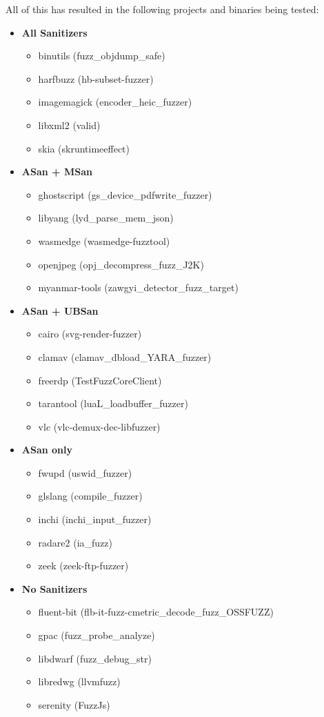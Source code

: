 \newpage
All of this has resulted in the following projects and binaries being tested:
\begin{itemize}
  \item \textbf{All Sanitizers}
  \begin{itemize}
    \item binutils (fuzz\_objdump\_safe)
    \item harfbuzz (hb-subset-fuzzer)
    \item imagemagick (encoder\_heic\_fuzzer)
    \item libxml2 (valid)
    \item skia (skruntimeeffect)
  \end{itemize}
  \item \textbf{ASan + MSan}
  \begin{itemize}
    \item ghostscript (gs\_device\_pdfwrite\_fuzzer)
    \item libyang (lyd\_parse\_mem\_json)
    \item wasmedge (wasmedge-fuzztool)
    \item openjpeg (opj\_decompress\_fuzz\_J2K)
    \item myanmar-tools (zawgyi\_detector\_fuzz\_target)
  \end{itemize}
  \item \textbf{ASan + UBSan}
  \begin{itemize}
    \item cairo (svg-render-fuzzer)
    \item clamav (clamav\_dbload\_YARA\_fuzzer)
    \item freerdp (TestFuzzCoreClient)
    \item tarantool (luaL\_loadbuffer\_fuzzer)
    \item vlc (vlc-demux-dec-libfuzzer)
  \end{itemize}
  \item \textbf{ASan only}
  \begin{itemize}
    \item fwupd (uswid\_fuzzer)
    \item glslang (compile\_fuzzer)
    \item inchi (inchi\_input\_fuzzer)
    \item radare2 (ia\_fuzz)
    \item zeek (zeek-ftp-fuzzer)
  \end{itemize}
  \item \textbf{No Sanitizers}
  \begin{itemize}
    \item fluent-bit (flb-it-fuzz-cmetric\_decode\_fuzz\_OSSFUZZ)
    \item gpac (fuzz\_probe\_analyze)
    \item libdwarf (fuzz\_debug\_str)
    \item libredwg (llvmfuzz)
    \item serenity (FuzzJs)
  \end{itemize}
\end{itemize}





